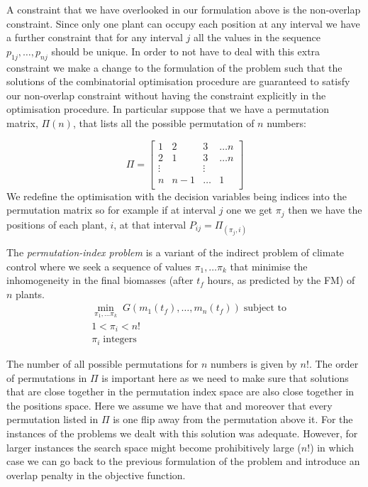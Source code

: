 A constraint that we have overlooked in our formulation above is the non-overlap
constraint. Since only one plant can occupy each position at any interval we
have a further constraint that for any interval $j$ all the values in the
sequence $p_{1j}, \dots, p_{nj}$ should be unique. In order to not have to deal with
this extra constraint we make a change to the formulation of the problem such
that the solutions of the combinatorial optimisation procedure are guaranteed to
satisfy our non-overlap constraint without having the constraint explicitly in
the optimisation procedure. In particular suppose that we have a permutation
matrix, $\Pi(n)$, that lists all the possible permutation of $n$ numbers:

$$
\Pi = \begin{bmatrix} 
    1 & 2 & 3 & \dots n \\
    2 & 1 & 3 & \dots n \\
    \vdots &  & \vdots \\
    n &  n-1 & \dots  &  1 \\
    \end{bmatrix}
$$
We redefine the optimisation with the decision variables being indices into the
permutation matrix so for example if at interval $j$ one we get $\pi_j$ then we
have the positions of each plant, $i$, at that interval $P_{ij} = \Pi_{(\pi_j, i)}$

\begin{definition}
The \emph{permutation-index problem} is a variant of the indirect problem of
climate control where we seek a sequence of values $\pi_1, \dots \pi_k$ that minimise the
inhomogeneity in the final biomasses (after $t_f$ hours, as predicted by the FM)
of $n$ plants.
\begin{align*}
& \min_{\pi_1, \dots \pi_k} \; G(m_1(t_f), \dots, m_n(t_f)) \; \text{subject to} \\
& 1 < \pi_i < n! \\
& \pi_i \; \text{integers}
\end{align*}
\end{definition}

The number of all possible permutations for $n$ numbers is given by $n!$. The
order of permutations in $\Pi$ is important here as we need to make sure that
solutions that are close together in the permutation index space are also close
together in the positions space. Here we assume we have that and moreover that
every permutation listed in $\Pi$ is one flip away from the permutation above
it. For the instances of the problems we dealt with this solution was
adequate. However, for larger instances the search space might become
prohibitively large ($n!$) in which case we can go back to the previous
formulation of the problem and introduce an overlap penalty in the objective
function.


